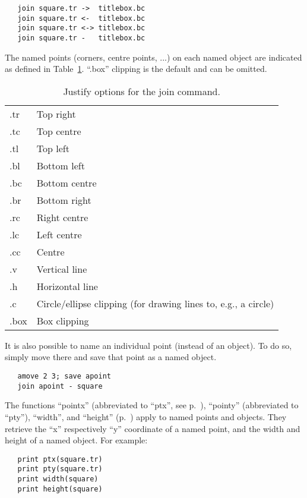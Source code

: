 \begin{verbatim}	 
   join square.tr ->  titlebox.bc
   join square.tr <-  titlebox.bc
   join square.tr <-> titlebox.bc
   join square.tr -   titlebox.bc
\end{verbatim}

The named points (corners, centre points, ...) on each named object are indicated as defined in Table~\ref{tab:justopt}. ``.box'' clipping is the default and can be omitted.

\begin{table}[tb]
\caption{\label{tab:justopt}Justify options for the join command.}
\centering
\begin{tabular}{ll}\hline
.tr	 & Top right \\
.tc	 & Top centre \\
.tl	 & Top left \\
.bl	 & Bottom left \\
.bc	 & Bottom centre \\
.br	 & Bottom right \\
.rc	 & Right centre  \\
.lc	 & Left centre  \\
.cc	 & Centre \\
.v 	 & Vertical line \\
.h 	 & Horizontal line \\
.c	 & Circle/ellipse clipping (for drawing lines to, e.g., a circle) \\
.box & Box clipping \\ \hline
\end{tabular}
\end{table}

It is also possible to name an individual point (instead of an object). To do so, simply move there and save that point as a named object.

\begin{verbatim}
   amove 2 3; save apoint
   join apoint - square
\end{verbatim}

The functions ``pointx'' (abbreviated to ``ptx'', see p.~\pageref{fct:pointxy}), ``pointy'' (abbreviated to ``pty''), ``width'', and ``height'' (p.~\pageref{fct:wdhi}) apply to named points and objects. They retrieve the ``x'' respectively ``y'' coordinate of a named point, and the width and height of a named object. For example:

\begin{verbatim}
   print ptx(square.tr)
   print pty(square.tr)
   print width(square)
   print height(square)
\end{verbatim}

